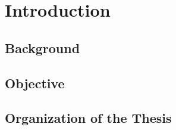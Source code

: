 \chapter{Introduction}
\label{chap:introduction}

\section{Background}
\label{sec:background}

\section{Objective}
\label{sec:objective}

\section{Organization of the Thesis}
\label{sec:organization}
